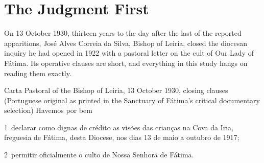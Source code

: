 \section{The Judgment First}\label{sec:judgment}

On 13 October 1930, thirteen years to the day after the last of the
reported apparitions, Jos\'e Alves Correia da Silva, Bishop of Leiria,
closed the diocesan inquiry he had opened in 1922 with a pastoral
letter on the cult of Our Lady of F\'atima. Its operative clauses are
short, and everything in this study hangs on reading them exactly.

\begin{operativetext}{Carta Pastoral of the Bishop of Leiria, 13
October 1930, closing clauses (Portuguese original as printed in the
Sanctuary of F\'atima's critical documentary selection)}
Havemos por bem\par
1\textordmasculine\ declarar como dignas de cr\'edito as vis\~oes das
crian\c{c}as na Cova da Iria, freguesia de F\'atima, desta Diocese,
nos dias 13 de maio a outubro de 1917;\par
2\textordmasculine\ permitir oficialmente o culto de Nossa Senhora de
F\'atima.
\end{operativetext}

